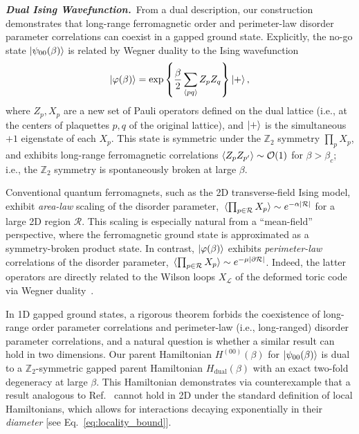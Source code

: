 \documentclass[aps,prl,twocolumn,floatfix,nofootinbib]{revtex4-2}
\theoremstyle{definition}
\begin{document}
\textbf{\textit{Dual Ising Wavefunction.}}~From a dual description, our construction demonstrates that long-range ferromagnetic order and perimeter-law disorder parameter correlations can coexist in a gapped ground state. Explicitly, the no-go state $\ket{\psi_{00}(\beta)}$ is related by Wegner duality to the Ising wavefunction
\begin{equation}
    \ket{\varphi(\beta)} = \exp \qty{ \frac{\beta}{2} \sum_{\expval{pq}} Z_{p} Z_{q} } \ket{+} ,
\end{equation}
where $Z_{p}, X_{p}$ are a new set of Pauli operators defined on the dual lattice (i.e., at the centers of plaquettes $p,q$ of the original lattice), and $\ket{+}$ is the simultaneous $+1$ eigenstate of each $X_{p}$. This state is symmetric under the $\mathbb{Z}_{2}$ symmetry $\prod_{p} X_{p}$, and exhibits long-range ferromagnetic correlations $\expval{Z_{p} Z_{p'}} \sim \mathcal{O}(1)$ for $\beta > \beta_{c}$; i.e., the $\mathbb{Z}_{2}$ symmetry is spontaneously broken at large $\beta$. 

{Conventional quantum ferromagnets, such as the 2D transverse-field Ising model, exhibit \emph{area-law} scaling of the disorder parameter, $\expval*{\prod_{p \in \mathcal{R}} X_p} \sim e^{-\alpha \abs{\mathcal{R}}}$ for a large 2D region $\mathcal{R}$. This scaling is especially natural from a ``mean-field'' perspective, where the ferromagnetic ground state is approximated as a symmetry-broken product state. In contrast,} $\ket{\varphi(\beta)}$ exhibits \emph{perimeter-law} correlations of the disorder parameter, $\expval*{\prod_{p \in \mathcal{R}} X_{p}} \sim e^{-\mu \abs{\partial \mathcal{R}}}$. Indeed, the latter operators are directly related to the Wilson loops $X_{\mathcal{L}}$ of the deformed toric code via Wegner duality~\cite{Wegner_duality_1971}. 

In 1D gapped ground states, a rigorous theorem \cite{Levin_constraints_2020} forbids the coexistence of long-range order parameter correlations and perimeter-law (i.e., long-ranged) disorder parameter correlations, and a natural question is whether a similar result can hold in two dimensions. Our parent Hamiltonian $H^{(00)}(\beta)$ for $\ket{\psi_{00}(\beta)}$ is dual to a $\mathbb{Z}_{2}$-symmetric gapped parent Hamiltonian $H_{\text{dual}}(\beta)$ with an exact two-fold degeneracy at large $\beta$. This Hamiltonian demonstrates via counterexample that a result analogous to Ref.~ cannot hold in 2D under the standard definition of local Hamiltonians, which allows for interactions decaying exponentially in their \emph{diameter} [see Eq.~\eqref{eq:locality_bound}]. 
\end{document}
